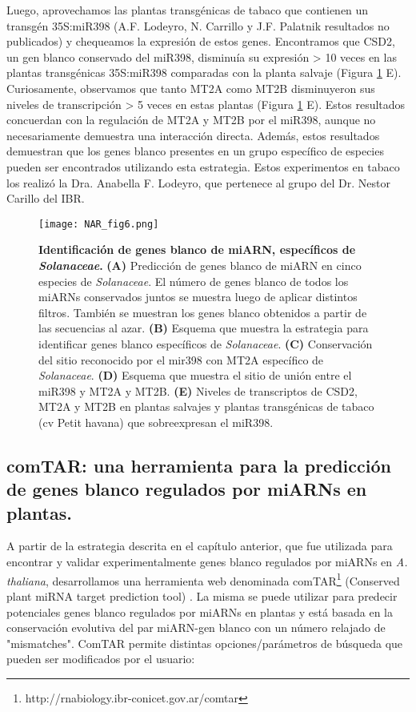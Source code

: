 Luego, aprovechamos las plantas transgénicas de tabaco que contienen un transgén 35S:miR398 (A.F. Lodeyro, N. Carrillo y J.F. Palatnik resultados no publicados) y chequeamos la expresión de estos genes.
Encontramos que CSD2, un gen blanco conservado del miR398, disminuía su expresión > 10 veces en las plantas transgénicas 35S:miR398 comparadas con la planta salvaje (Figura \ref{fig:NAR_fig6} E).
Curiosamente, observamos que tanto MT2A como MT2B  disminuyeron sus niveles de transcripción > 5 veces en estas plantas (Figura \ref{fig:NAR_fig6} E).
Estos resultados concuerdan con la regulación de MT2A y MT2B por el miR398, aunque no necesariamente demuestra una interacción directa.
Además, estos resultados demuestran que los genes blanco presentes en un grupo específico de especies pueden ser encontrados utilizando esta estrategia.
Estos experimentos en tabaco los realizó la Dra. Anabella F. Lodeyro, que pertenece al grupo del Dr. Nestor Carillo del IBR.

\begin{figure}[htbp!] 
    \centering    
    \texttt{[image: NAR\_fig6.png]}
    \caption[Identificación de genes blanco de miARN, específicos de \textit{Solanaceae}]{
    \textbf{Identificación de genes blanco de miARN, específicos de \textit{Solanaceae}.}
    \textbf{(A)} Predicción de genes blanco de miARN en cinco especies de \textit{Solanaceae}.
    El número de genes blanco de todos los miARNs conservados juntos se muestra luego de aplicar distintos filtros.
    También se muestran los genes blanco obtenidos a partir de las secuencias al azar.
    \textbf{(B)} Esquema que muestra la estrategia para identificar genes blanco específicos de \textit{Solanaceae}.
    \textbf{(C)} Conservación del sitio reconocido por el mir398 con MT2A específico de \textit{Solanaceae}.
    \textbf{(D)} Esquema que muestra el sitio de unión entre el miR398 y MT2A y MT2B.
    \textbf{(E)} Niveles de transcriptos de CSD2, MT2A y MT2B en plantas salvajes y plantas transgénicas de tabaco (cv Petit havana) que sobreexpresan el miR398.  }
    \label{fig:NAR_fig6}
\end{figure}


\subsection{comTAR: una herramienta para la predicción de genes blanco regulados por miARNs en plantas.} 

A partir de la estrategia descrita en el capítulo anterior, que fue utilizada para encontrar y validar experimentalmente genes blanco regulados por miARNs en \textit{A. thaliana}, desarrollamos una herramienta web denominada comTAR\footnote{http://rnabiology.ibr-conicet.gov.ar/comtar} (Conserved plant miRNA target prediction tool) \citep{Chorostecki2014}.
La misma se puede utilizar para predecir potenciales genes blanco regulados por miARNs en plantas y está basada en la conservación evolutiva del par miARN-gen blanco con un número relajado de "mismatches".
ComTAR permite distintas opciones/parámetros de búsqueda que pueden ser modificados por el usuario:

